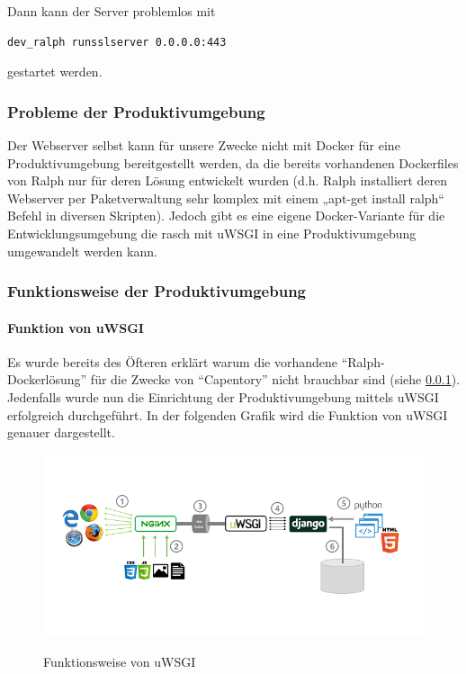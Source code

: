 Dann kann der Server problemlos mit

\begin{verbatim}
dev_ralph runsslserver 0.0.0.0:443
\end{verbatim}

gestartet werden.

\hypertarget{probleme-der-produktivumgebung}{%
\subsubsection{Probleme der
Produktivumgebung}\label{probleme-der-produktivumgebung}}

Der Webserver selbst kann für unsere Zwecke nicht mit Docker für eine
Produktivumgebung bereitgestellt werden, da die bereits vorhandenen
Dockerfiles von Ralph nur für deren Lösung entwickelt wurden (d.h. Ralph
installiert deren Webserver per Paketverwaltung sehr komplex mit einem
„apt-get install ralph`` Befehl in diversen Skripten). Jedoch gibt es
eine eigene Docker-Variante für die Entwicklungsumgebung die rasch mit
uWSGI in eine Produktivumgebung umgewandelt werden kann.

\hypertarget{funktionsweise-der-produktivumgebung}{%
\subsubsection{Funktionsweise der
Produktivumgebung}\label{funktionsweise-der-produktivumgebung}}

\hypertarget{funktion-von-uwsgi}{%
\paragraph{Funktion von uWSGI}\label{funktion-von-uwsgi}}

Es wurde bereits des Öfteren erklärt warum die vorhandene
``Ralph-Dockerlösung'' für die Zwecke von ``Capentory'' nicht brauchbar
sind (siehe \ref{probleme-der-produktivumgebung}). Jedenfalls wurde nun
die Einrichtung der Produktivumgebung mittels uWSGI erfolgreich
durchgeführt. In der folgenden Grafik wird die Funktion von uWSGI
genauer dargestellt.

\begin{figure}[ht]
\centering
\includegraphics{uwsgi.png}
\caption{Funktionsweise von uWSGI}
\cite{uwsgi}
\end{figure}

